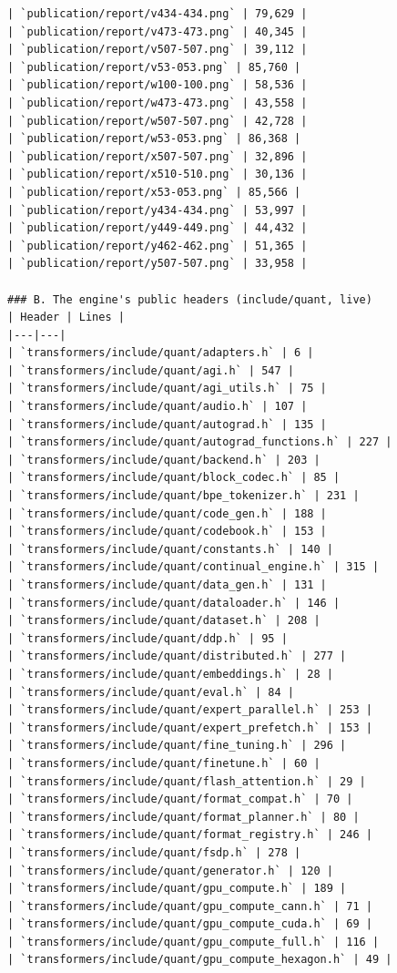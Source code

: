 \begin{Verbatim}[breaklines,breakanywhere,fontsize=\footnotesize]
| `publication/report/v434-434.png` | 79,629 |
| `publication/report/v473-473.png` | 40,345 |
| `publication/report/v507-507.png` | 39,112 |
| `publication/report/v53-053.png` | 85,760 |
| `publication/report/w100-100.png` | 58,536 |
| `publication/report/w473-473.png` | 43,558 |
| `publication/report/w507-507.png` | 42,728 |
| `publication/report/w53-053.png` | 86,368 |
| `publication/report/x507-507.png` | 32,896 |
| `publication/report/x510-510.png` | 30,136 |
| `publication/report/x53-053.png` | 85,566 |
| `publication/report/y434-434.png` | 53,997 |
| `publication/report/y449-449.png` | 44,432 |
| `publication/report/y462-462.png` | 51,365 |
| `publication/report/y507-507.png` | 33,958 |

### B. The engine's public headers (include/quant, live)
| Header | Lines |
|---|---|
| `transformers/include/quant/adapters.h` | 6 |
| `transformers/include/quant/agi.h` | 547 |
| `transformers/include/quant/agi_utils.h` | 75 |
| `transformers/include/quant/audio.h` | 107 |
| `transformers/include/quant/autograd.h` | 135 |
| `transformers/include/quant/autograd_functions.h` | 227 |
| `transformers/include/quant/backend.h` | 203 |
| `transformers/include/quant/block_codec.h` | 85 |
| `transformers/include/quant/bpe_tokenizer.h` | 231 |
| `transformers/include/quant/code_gen.h` | 188 |
| `transformers/include/quant/codebook.h` | 153 |
| `transformers/include/quant/constants.h` | 140 |
| `transformers/include/quant/continual_engine.h` | 315 |
| `transformers/include/quant/data_gen.h` | 131 |
| `transformers/include/quant/dataloader.h` | 146 |
| `transformers/include/quant/dataset.h` | 208 |
| `transformers/include/quant/ddp.h` | 95 |
| `transformers/include/quant/distributed.h` | 277 |
| `transformers/include/quant/embeddings.h` | 28 |
| `transformers/include/quant/eval.h` | 84 |
| `transformers/include/quant/expert_parallel.h` | 253 |
| `transformers/include/quant/expert_prefetch.h` | 153 |
| `transformers/include/quant/fine_tuning.h` | 296 |
| `transformers/include/quant/finetune.h` | 60 |
| `transformers/include/quant/flash_attention.h` | 29 |
| `transformers/include/quant/format_compat.h` | 70 |
| `transformers/include/quant/format_planner.h` | 80 |
| `transformers/include/quant/format_registry.h` | 246 |
| `transformers/include/quant/fsdp.h` | 278 |
| `transformers/include/quant/generator.h` | 120 |
| `transformers/include/quant/gpu_compute.h` | 189 |
| `transformers/include/quant/gpu_compute_cann.h` | 71 |
| `transformers/include/quant/gpu_compute_cuda.h` | 69 |
| `transformers/include/quant/gpu_compute_full.h` | 116 |
| `transformers/include/quant/gpu_compute_hexagon.h` | 49 |

\end{Verbatim}
